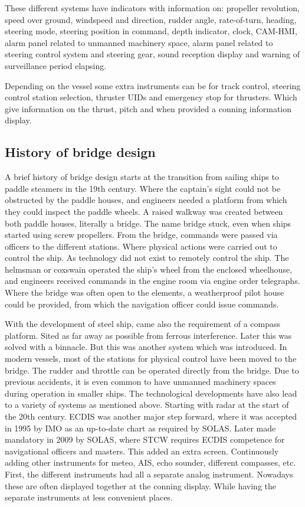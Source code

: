 These different systems have indicators with information on: propeller revolution, speed over ground, windspeed and direction, rudder angle, rate-of-turn, heading, steering mode, steering position in command, depth indicator, clock, \ac{CAM-HMI}, alarm panel related to unmanned machinery space, alarm panel related to steering control system and steering gear, sound reception display and warning of surveillance period elapsing. 

Depending on the vessel some extra instruments can be for track control, steering control station selection, thruster \ac{UID}s and emergency stop for thrusters. Which give information on the thrust, pitch and when provided a conning information display. \cite{DNVGL2017}


\subsection{History of bridge design}
A brief history of bridge design starts at the transition from sailing ships to paddle steamers in the 19th century. Where the captain's sight could not be obstructed by the paddle houses, and engineers needed a platform from which they could inspect the paddle wheels. A raised walkway was created between both paddle houses, literally a bridge. The name bridge stuck, even when ships started using screw propellers. From the bridge, commands were passed via officers to the different stations. Where physical actions were carried out to control the ship. As technology did not exist to remotely control the ship. The helmsman or coxswain operated the ship's wheel from the enclosed wheelhouse, and engineers received commands in the engine room via engine order telegraphs. Where the bridge was often open to the elements, a weatherproof pilot house could be provided, from which the navigation officer could issue commands.

With the development of steel ship, came also the requirement of a compass platform. Sited as far away as possible from ferrous interference. Later this was solved with a binnacle. But this was another system which was introduced. In modern vessels, most of the stations for physical control have been moved to the bridge. The rudder and throttle can be operated directly from the bridge. Due to previous accidents, it is even common to have unmanned machinery spaces during operation in smaller ships. The technological developments have also lead to a variety of systems as mentioned above. Starting with radar at the start of the 20th century. \ac{ECDIS} was another major step forward, where it was accepted in 1995 by IMO as an up-to-date chart as required by \ac{SOLAS}. Later made mandatory in 2009 by \ac{SOLAS}, where \ac{STCW} requires \ac{ECDIS} competence for navigational officers and masters. This added an extra screen. Continuously adding other instruments for meteo, \ac{AIS}, echo sounder, different compasses, etc. First, the different instruments had all a separate analog instrument. Nowadays these are often displayed together at the conning display. While having the separate instruments at less convenient places.

